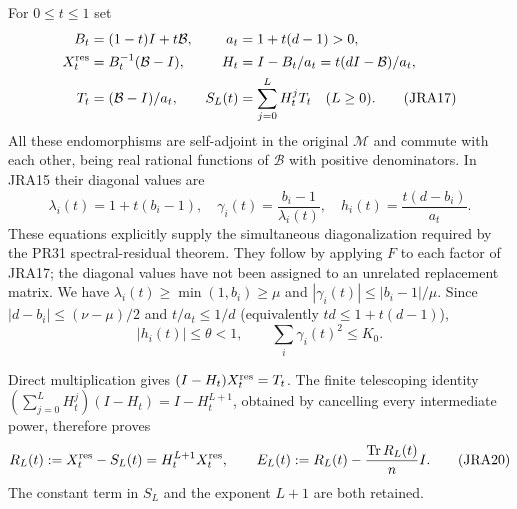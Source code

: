For $0\leq t\leq1$ set
\begin{align}
 B_t&=(1-t)I+t\mathcal B,&a_t&=1+t(d-1)>0,\notag\\
 X_t^{\rm res}&=B_t^{-1}(\mathcal B-I),&
 H_t&=I-B_t/a_t=t(dI-\mathcal B)/a_t,\notag\\
 T_t&=(\mathcal B-I)/a_t,&
 S_L(t)&=\sum_{j=0}^L H_t^jT_t\quad(L\geq0).
 \tag{JRA17}
\end{align}
All these endomorphisms are self-adjoint in the original $\mathcal M$
and commute with each other, being real rational functions of
$\mathcal B$ with positive denominators. In JRA15 their diagonal values are
\begin{equation}
 \lambda_i(t)=1+t(b_i-1),\quad
 \gamma_i(t)=\frac{b_i-1}{\lambda_i(t)},\quad
 h_i(t)=\frac{t(d-b_i)}{a_t}.
 \tag{JRA18}
\end{equation}
These equations explicitly supply the simultaneous diagonalization
required by the PR31 spectral-residual theorem. They follow by applying
$F$ to each factor of JRA17; the diagonal values have not been assigned
to an unrelated replacement matrix.
We have $\lambda_i(t)\geq\min(1,b_i)\geq\mu$ and
$|\gamma_i(t)|\leq|b_i-1|/\mu$.
Since $|d-b_i|\leq(\nu-\mu)/2$ and
$t/a_t\leq1/d$ (equivalently $td\leq1+t(d-1)$),
\begin{equation}
 |h_i(t)|\leq\theta<1,\qquad
 \sum_i\gamma_i(t)^2\leq K_0.
 \tag{JRA19}
\end{equation}

Direct multiplication gives $(I-H_t)X_t^{\rm res}=T_t$. The finite
telescoping identity
$\left(\sum_{j=0}^L H_t^j\right)(I-H_t)=I-H_t^{L+1}$, obtained by
cancelling every intermediate power, therefore proves
\begin{equation}
 R_L(t):=X_t^{\rm res}-S_L(t)=H_t^{L+1}X_t^{\rm res},\qquad
 E_L(t):=R_L(t)-\frac{\operatorname{Tr} R_L(t)}{n}I.
 \tag{JRA20}
\end{equation}
The constant term in $S_L$ and the exponent $L+1$ are both retained.

